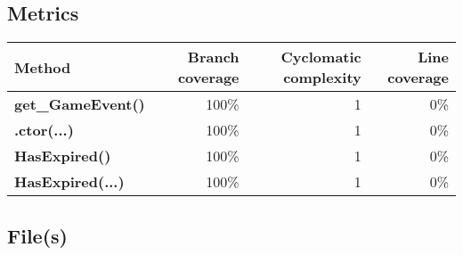 \documentclass[a4paper,landscape,10pt]{article}
\begin{document}
\subsection{Metrics}
\begin{longtable}[l]{|l|r|r|r|}
\hline
\textbf{Method} & \textbf{Branch coverage} & \textbf{Cyclomatic complexity} & \textbf{Line coverage}\\
\hline
\textbf{get\_GameEvent()} & 100\% & 1 & 0\%\\
\hline
\textbf{.ctor(...)} & 100\% & 1 & 0\%\\
\hline
\textbf{HasExpired()} & 100\% & 1 & 0\%\\
\hline
\textbf{HasExpired(...)} & 100\% & 1 & 0\%\\
\hline
\end{longtable}
\subsection{File(s)}
\end{document}
